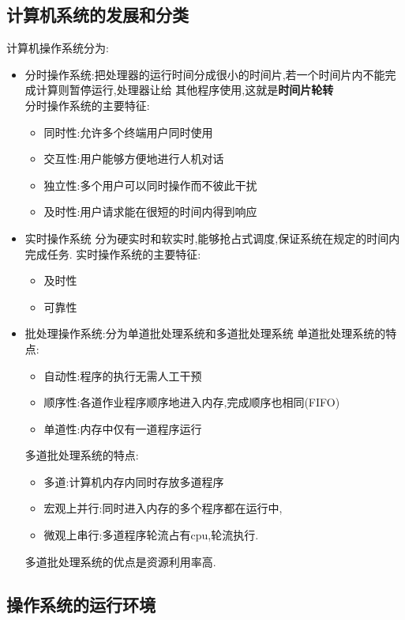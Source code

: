 \documentclass{ctexart}
\begin{document}
\subsection{计算机系统的发展和分类}
计算机操作系统分为:
\begin{itemize}
	\item 分时操作系统:把处理器的运行时间分成很小的时间片,若一个时间片内不能完成计算则暂停运行,处理器让给
	      其他程序使用,这就是\textbf{时间片轮转}\\
	      分时操作系统的主要特征:
	      \begin{itemize}
		      \item 同时性:允许多个终端用户同时使用
		      \item 交互性:用户能够方便地进行人机对话
		      \item 独立性:多个用户可以同时操作而不彼此干扰
		      \item 及时性:用户请求能在很短的时间内得到响应
	      \end{itemize}
	\item 实时操作系统
	      分为硬实时和软实时,能够抢占式调度,保证系统在规定的时间内完成任务.
	      实时操作系统的主要特征:
	      \begin{itemize}
		      \item 及时性
		      \item 可靠性
	      \end{itemize}
	\item 批处理操作系统:分为单道批处理系统和多道批处理系统
	      单道批处理系统的特点:
	      \begin{itemize}
		      \item 自动性:程序的执行无需人工干预
		      \item 顺序性:各道作业程序顺序地进入内存,完成顺序也相同(FIFO)
		      \item 单道性:内存中仅有一道程序运行
	      \end{itemize}
	      多道批处理系统的特点:
	      \begin{itemize}
		      \item 多道:计算机内存内同时存放多道程序
		      \item 宏观上并行:同时进入内存的多个程序都在运行中,
		      \item 微观上串行:多道程序轮流占有cpu,轮流执行.
	      \end{itemize}
	      多道批处理系统的优点是资源利用率高.
\end{itemize}
\subsection{操作系统的运行环境}
\end{document}
